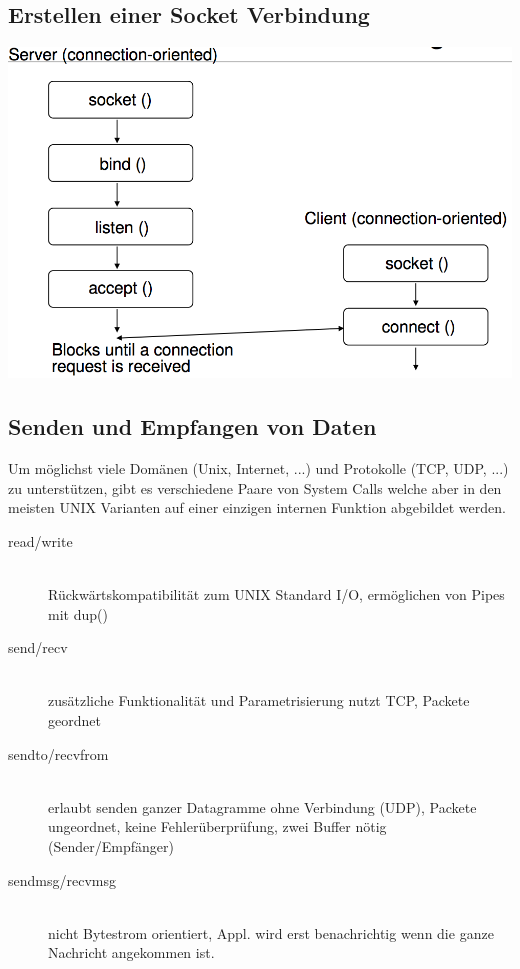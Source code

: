 \documentclass[10pt]{article}
\begin{document}
\subsection{Erstellen einer Socket Verbindung}
\begin{center}
	\includegraphics[scale=0.2]{socket-verbindungsaufbau.png}
\end{center}

\subsection{Senden und Empfangen von Daten}
Um möglichst viele Domänen (Unix, Internet, ...) und Protokolle (TCP, UDP, ...) zu unterstützen, gibt es verschiedene Paare von System Calls welche aber in den meisten UNIX Varianten auf einer einzigen internen Funktion abgebildet werden.
\begin{description}
	\item[read/write] \hfill \\ Rückwärtskompatibilität zum UNIX Standard I/O, ermöglichen von Pipes mit dup()
	\item[send/recv] \hfill \\ zusätzliche Funktionalität und Parametrisierung  nutzt TCP, Packete geordnet
	\item[sendto/recvfrom] \hfill \\ erlaubt senden ganzer Datagramme ohne Verbindung (UDP), Packete ungeordnet, keine Fehlerüberprüfung, zwei Buffer nötig (Sender/Empfänger)
	\item[sendmsg/recvmsg] \hfill \\ nicht Bytestrom orientiert, Appl. wird erst benachrichtig wenn die ganze Nachricht angekommen ist.
\end{description}
\end{document}
